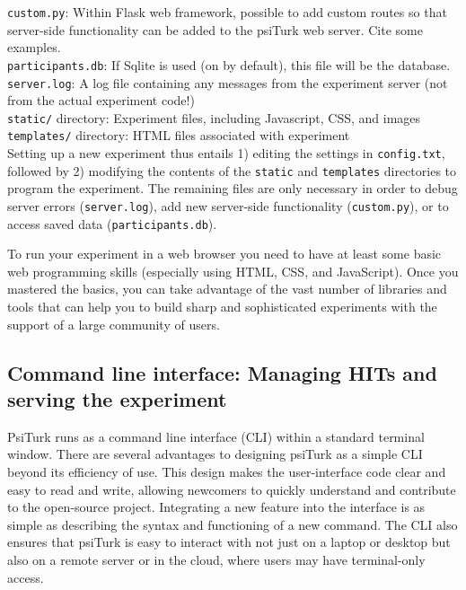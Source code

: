 \documentclass[twocolumn]{svjour3}          %
\begin{document}
\noindent \texttt{custom.py}: Within Flask web framework, possible to add custom routes so that server-side functionality can be added to the psiTurk web server.
Cite some examples. \\ 

\noindent \texttt{participants.db}: If Sqlite is used (on by default), this file will be the database. \\

\noindent \texttt{server.log}: A log file containing any messages from the experiment server (not from the actual experiment code!) \\ 

\noindent \texttt{static/} directory: Experiment files, including Javascript, CSS, and images \\

\noindent \texttt{templates/} directory: HTML files associated with experiment \\


Setting up a new experiment thus entails 1) editing the settings in \texttt{config.txt}, followed by 2) modifying the contents of the \texttt{static} and \texttt{templates} directories to program the experiment.
The remaining files are only necessary in order to debug server errors (\texttt{server.log}), add new server-side functionality (\texttt{custom.py}), or to access saved data (\texttt{participants.db}).

To run your experiment in a web browser you need to have at least some basic web programming skills (especially using HTML, CSS, and JavaScript).
Once you mastered the basics, you can take advantage of the vast number of libraries and tools that can help you to build sharp and sophisticated experiments with the support of a large community of users.


\subsection{Command line interface: Managing HITs and serving the experiment}

PsiTurk runs as a command line interface (CLI) within a standard terminal window.
There are several advantages to designing psiTurk as a simple CLI beyond its efficiency of use. This
design makes the user-interface code clear and easy to read and write, allowing newcomers to quickly
understand and contribute to the open-source project. Integrating a new feature into the interface
is as simple as describing the syntax and functioning of a new command. The CLI also ensures that
psiTurk is easy to interact with not just on a laptop or desktop but also on a remote server or in
the cloud, where users may have terminal-only access.
 
\end{document}
